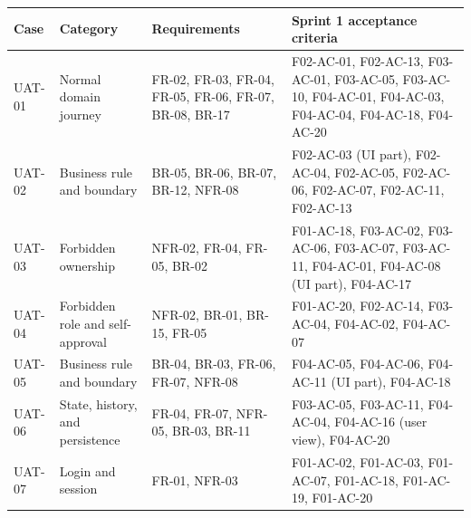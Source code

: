 {\def\LTcaptype{none} %
\begin{longtable}[]{@{}
  >{\raggedright\arraybackslash}p{}
  >{\raggedright\arraybackslash}p{}
  >{\raggedright\arraybackslash}p{}
  >{\raggedright\arraybackslash}p{}@{}}
\toprule\noalign{}
\begin{minipage}[b]{\linewidth}\raggedright
Case
\end{minipage} & \begin{minipage}[b]{\linewidth}\raggedright
Category
\end{minipage} & \begin{minipage}[b]{\linewidth}\raggedright
Requirements
\end{minipage} & \begin{minipage}[b]{\linewidth}\raggedright
Sprint 1 acceptance criteria
\end{minipage} \\
\midrule\noalign{}
\endhead
\bottomrule\noalign{}
\endlastfoot
UAT-01 & Normal domain journey & FR-02, FR-03, FR-04, FR-05, FR-06, FR-07, BR-08, BR-17 & F02-AC-01, F02-AC-13, F03-AC-01, F03-AC-05, F03-AC-10, F04-AC-01, F04-AC-03, F04-AC-04, F04-AC-18, F04-AC-20 \\
UAT-02 & Business rule and boundary & BR-05, BR-06, BR-07, BR-12, NFR-08 & F02-AC-03 (UI part), F02-AC-04, F02-AC-05, F02-AC-06, F02-AC-07, F02-AC-11, F02-AC-13 \\
UAT-03 & Forbidden ownership & NFR-02, FR-04, FR-05, BR-02 & F01-AC-18, F03-AC-02, F03-AC-06, F03-AC-07, F03-AC-11, F04-AC-01, F04-AC-08 (UI part), F04-AC-17 \\
UAT-04 & Forbidden role and self-approval & NFR-02, BR-01, BR-15, FR-05 & F01-AC-20, F02-AC-14, F03-AC-04, F04-AC-02, F04-AC-07 \\
UAT-05 & Business rule and boundary & BR-04, BR-03, FR-06, FR-07, NFR-08 & F04-AC-05, F04-AC-06, F04-AC-11 (UI part), F04-AC-18 \\
UAT-06 & State, history, and persistence & FR-04, FR-07, NFR-05, BR-03, BR-11 & F03-AC-05, F03-AC-11, F04-AC-04, F04-AC-16 (user view), F04-AC-20 \\
UAT-07 & Login and session & FR-01, NFR-03 & F01-AC-02, F01-AC-03, F01-AC-07, F01-AC-18, F01-AC-19, F01-AC-20 \\
\end{longtable}
}

